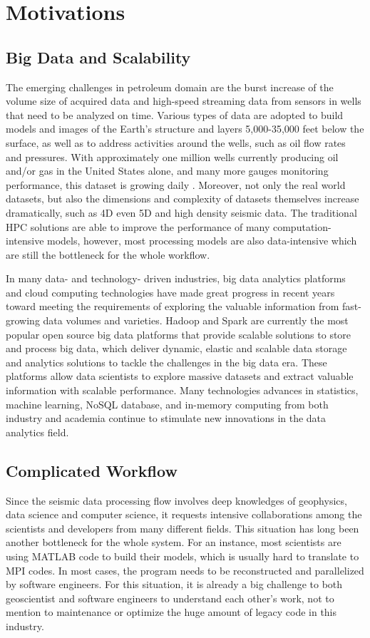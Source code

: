 \section{Motivations}

\subsection{Big Data and Scalability}

The emerging challenges in petroleum domain are the burst increase of the volume size of acquired data and high-speed streaming data from sensors in wells that need to be analyzed on time. Various types of data are adopted to build models and images of the Earth's structure and layers 5,000-35,000 feet below the surface, as well as to address activities around the wells, such as oil flow rates and pressures. With approximately one million wells currently producing oil and/or gas in the United States alone, and many more gauges monitoring performance, this dataset is growing daily \cite{bigdataofindustry}. Moreover, not only the real world datasets, but also the dimensions and complexity of datasets themselves increase dramatically, such as 4D even 5D and high density seismic data. The traditional HPC solutions are able to improve the performance of many computation-intensive models, however,  most processing models are also data-intensive which are still the bottleneck for the whole workflow. 

In many data- and technology- driven industries, big data analytics platforms and cloud computing technologies have made great progress in recent years toward meeting the requirements of exploring the valuable information from fast-growing data volumes and varieties.  Hadoop and Spark are currently the most popular open source big data platforms that provide scalable solutions to store and process big data, which deliver dynamic, elastic and scalable data storage and analytics solutions to tackle the challenges in the big data era. These platforms allow data scientists to explore massive datasets and extract valuable information with scalable performance. Many technologies advances in statistics, machine learning, NoSQL database, and in-memory computing from both industry and academia continue to stimulate new innovations in the data analytics field.

\subsection{Complicated Workflow}
Since the seismic data processing flow involves deep knowledges of geophysics, data science and computer science, it requests intensive collaborations among the scientists and developers from many different fields. This situation has long been another bottleneck for the whole system. For an instance, most scientists are using MATLAB code to build their models, which is usually hard to translate to MPI codes. In most cases, the program needs to be reconstructed and parallelized by software engineers. For this situation, it is already a big challenge to both geoscientist and software engineers to understand each other's work, not to mention to maintenance or optimize the huge amount of legacy code in this industry.


